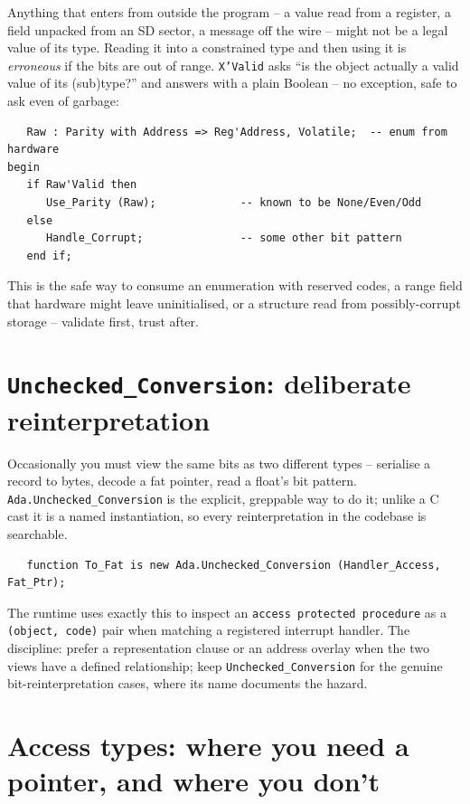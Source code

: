 Anything that enters from outside the program -- a value read from a register, a
field unpacked from an SD sector, a message off the wire -- might not be a legal
value of its type. Reading it into a constrained type and then using it is
\emph{erroneous} if the bits are out of range. \texttt{X'Valid} asks ``is the
object actually a valid value of its (sub)type?'' and answers with a plain
Boolean -- no exception, safe to ask even of garbage:

\begin{lstlisting}
   Raw : Parity with Address => Reg'Address, Volatile;  -- enum from hardware
begin
   if Raw'Valid then
      Use_Parity (Raw);             -- known to be None/Even/Odd
   else
      Handle_Corrupt;               -- some other bit pattern
   end if;
\end{lstlisting}

This is the safe way to consume an enumeration with reserved codes, a range field
that hardware might leave uninitialised, or a structure read from possibly-corrupt
storage -- validate first, trust after.

\section{\texttt{Unchecked\_Conversion}: deliberate reinterpretation}
\label{sec:uncheck}

Occasionally you must view the same bits as two different types -- serialise a
record to bytes, decode a fat pointer, read a float's bit pattern.
\texttt{Ada.Unchecked\_Conversion} is the explicit, greppable way to do it; unlike
a C cast it is a named instantiation, so every reinterpretation in the codebase is
searchable.

\begin{lstlisting}
   function To_Fat is new Ada.Unchecked_Conversion (Handler_Access, Fat_Ptr);
\end{lstlisting}

The runtime uses exactly this to inspect an \texttt{access protected procedure}
as a \texttt{(object, code)} pair when matching a registered interrupt handler.
The discipline: prefer a representation clause or an address overlay when the two
views have a defined relationship; keep \texttt{Unchecked\_Conversion} for the
genuine bit-reinterpretation cases, where its name documents the hazard.

\section{Access types: where you need a pointer, and where you don't}
\label{sec:access}

